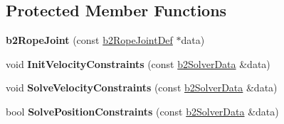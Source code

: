 \subsection*{Protected Member Functions}
\begin{DoxyCompactItemize}
\item 
\hypertarget{classb2_rope_joint_a3f69f238616d8dc622d9448f81e14e53}{{\bfseries b2\-Rope\-Joint} (const \hyperlink{structb2_rope_joint_def}{b2\-Rope\-Joint\-Def} $\ast$data)}\label{classb2_rope_joint_a3f69f238616d8dc622d9448f81e14e53}

\item 
\hypertarget{classb2_rope_joint_a8146dad7f839f1285ab596661c3a84fa}{void {\bfseries Init\-Velocity\-Constraints} (const \hyperlink{structb2_solver_data}{b2\-Solver\-Data} \&data)}\label{classb2_rope_joint_a8146dad7f839f1285ab596661c3a84fa}

\item 
\hypertarget{classb2_rope_joint_ab3e9a866833f5ad079473ece272d3c88}{void {\bfseries Solve\-Velocity\-Constraints} (const \hyperlink{structb2_solver_data}{b2\-Solver\-Data} \&data)}\label{classb2_rope_joint_ab3e9a866833f5ad079473ece272d3c88}

\item 
\hypertarget{classb2_rope_joint_a50794029b91cd469b0598fe25a77948f}{bool {\bfseries Solve\-Position\-Constraints} (const \hyperlink{structb2_solver_data}{b2\-Solver\-Data} \&data)}\label{classb2_rope_joint_a50794029b91cd469b0598fe25a77948f}

\end{DoxyCompactItemize}
